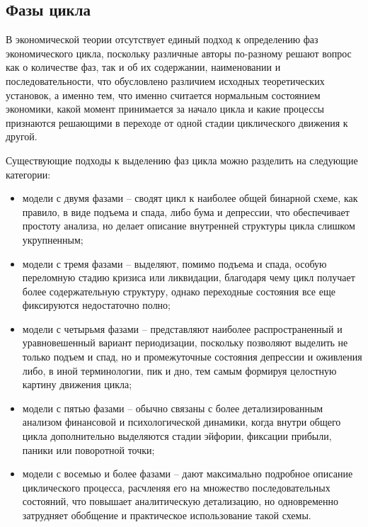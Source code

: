 \subsection{Фазы цикла} %
В экономической теории отсутствует единый подход к определению фаз экономического цикла, поскольку различные авторы по-разному решают вопрос как о количестве фаз, так и об их содержании, наименовании и последовательности, что обусловлено различием исходных теоретических установок, а именно тем, что именно считается нормальным состоянием экономики, какой момент принимается за начало цикла и какие процессы признаются решающими в переходе от одной стадии циклического движения к другой.

Существующие подходы к выделению фаз цикла можно разделить на следующие категории:
\begin{itemize}
    \item модели с двумя фазами – сводят цикл к наиболее общей бинарной схеме, как правило, в виде подъема и спада, либо бума и депрессии, что обеспечивает простоту анализа, но делает описание внутренней структуры цикла слишком укрупненным;
    \item модели с тремя фазами – выделяют, помимо подъема и спада, особую переломную стадию кризиса или ликвидации, благодаря чему цикл получает более содержательную структуру, однако переходные состояния все еще фиксируются недостаточно полно;
    \item модели с четырьмя фазами – представляют наиболее распространенный и уравновешенный вариант периодизации, поскольку позволяют выделить не только подъем и спад, но и промежуточные состояния депрессии и оживления либо, в иной терминологии, пик и дно, тем самым формируя целостную картину движения цикла;
    \item модели с пятью фазами – обычно связаны с более детализированным анализом финансовой и психологической динамики, когда внутри общего цикла дополнительно выделяются стадии эйфории, фиксации прибыли, паники или поворотной точки;
    \item модели с восемью и более фазами – дают максимально подробное описание циклического процесса, расчленяя его на множество последовательных состояний, что повышает аналитическую детализацию, но одновременно затрудняет обобщение и практическое использование такой схемы.
\end{itemize}

